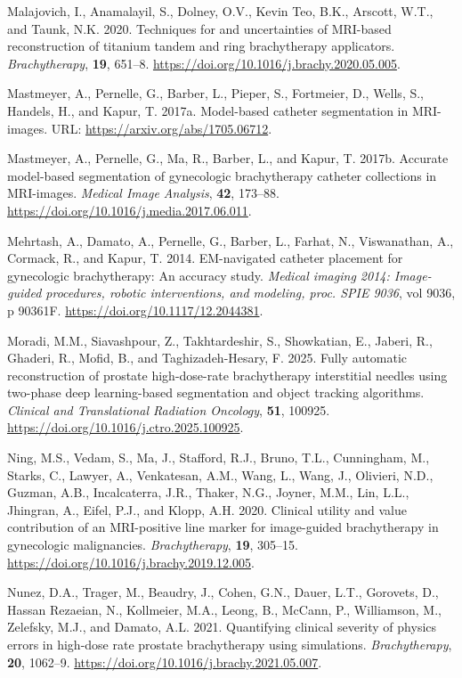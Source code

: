 \documentclass[
  11pt,
]{article}
\newlength{\cslhangindent}
\newenvironment{CSLReferences}[2] %
 {\begin{list}{}{%
  \setlength{\itemindent}{0pt}
  \setlength{\leftmargin}{0pt}
  \setlength{\parsep}{0pt}
  \ifodd #1
   \setlength{\leftmargin}{\cslhangindent}
   \setlength{\itemindent}{-1\cslhangindent}
  \fi
  \setlength{\itemsep}{#2\baselineskip}}}
 {\end{list}}
\begin{document}
\begin{CSLReferences}{1}{1}
Malajovich, I., Anamalayil, S., Dolney, O.V., Kevin Teo, B.K., Arscott,
W.T., and Taunk, N.K. 2020. Techniques for and uncertainties of
MRI-based reconstruction of titanium tandem and ring brachytherapy
applicators. \emph{Brachytherapy}, \textbf{19}, 651--8.
\url{https://doi.org/10.1016/j.brachy.2020.05.005}.

Mastmeyer, A., Pernelle, G., Barber, L., Pieper, S., Fortmeier, D.,
Wells, S., Handels, H., and Kapur, T. 2017a. Model-based catheter
segmentation in MRI-images. URL: \url{https://arxiv.org/abs/1705.06712}.

Mastmeyer, A., Pernelle, G., Ma, R., Barber, L., and Kapur, T. 2017b.
Accurate model-based segmentation of gynecologic brachytherapy catheter
collections in {MRI}-images. \emph{Medical Image Analysis}, \textbf{42},
173--88. \url{https://doi.org/10.1016/j.media.2017.06.011}.

Mehrtash, A., Damato, A., Pernelle, G., Barber, L., Farhat, N.,
Viswanathan, A., Cormack, R., and Kapur, T. 2014. EM-navigated catheter
placement for gynecologic brachytherapy: An accuracy study.
\emph{Medical imaging 2014: Image-guided procedures, robotic
interventions, and modeling, proc. SPIE 9036}, vol 9036, p 90361F.
\url{https://doi.org/10.1117/12.2044381}.

Moradi, M.M., Siavashpour, Z., Takhtardeshir, S., Showkatian, E.,
Jaberi, R., Ghaderi, R., Mofid, B., and Taghizadeh-Hesary, F. 2025.
Fully automatic reconstruction of prostate high-dose-rate brachytherapy
interstitial needles using two-phase deep learning-based segmentation
and object tracking algorithms. \emph{Clinical and Translational
Radiation Oncology}, \textbf{51}, 100925.
\url{https://doi.org/10.1016/j.ctro.2025.100925}.

Ning, M.S., Vedam, S., Ma, J., Stafford, R.J., Bruno, T.L., Cunningham,
M., Starks, C., Lawyer, A., Venkatesan, A.M., Wang, L., Wang, J.,
Olivieri, N.D., Guzman, A.B., Incalcaterra, J.R., Thaker, N.G., Joyner,
M.M., Lin, L.L., Jhingran, A., Eifel, P.J., and Klopp, A.H. 2020.
Clinical utility and value contribution of an MRI-positive line marker
for image-guided brachytherapy in gynecologic malignancies.
\emph{Brachytherapy}, \textbf{19}, 305--15.
\url{https://doi.org/10.1016/j.brachy.2019.12.005}.

Nunez, D.A., Trager, M., Beaudry, J., Cohen, G.N., Dauer, L.T.,
Gorovets, D., Hassan Rezaeian, N., Kollmeier, M.A., Leong, B., McCann,
P., Williamson, M., Zelefsky, M.J., and Damato, A.L. 2021. Quantifying
clinical severity of physics errors in high-dose rate prostate
brachytherapy using simulations. \emph{Brachytherapy}, \textbf{20},
1062--9. \url{https://doi.org/10.1016/j.brachy.2021.05.007}.


\end{CSLReferences}
\end{document}
